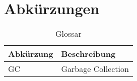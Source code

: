 \chapter*{Abkürzungen}\label{abkuerzungen}
  \begin{longtable}{|p{3cm}|p{11cm}|}
      \caption{Glossar}\\
\hline
  \textbf{Abkürzung} & \textbf{Beschreibung} \\\hline
  GC & Garbage Collection \\\hline
  \end{longtable}


